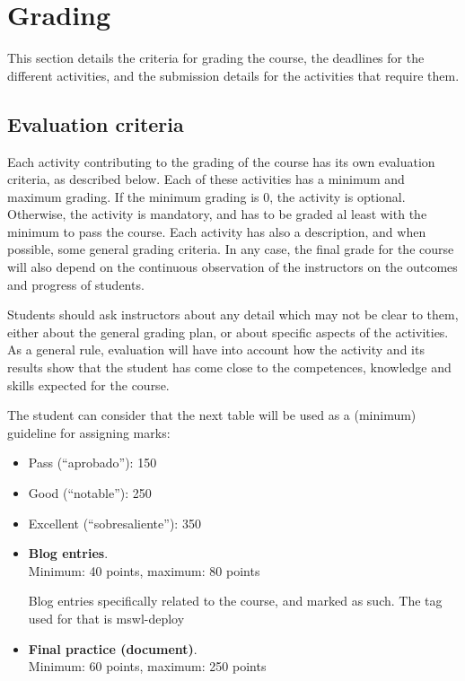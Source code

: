 \documentclass[a4paper]{article}
\begin{document}
\section{Grading}

This section details the criteria for grading the course, the
deadlines for the different activities, and the submission details for
the activities that require them.

\subsection{Evaluation criteria}
\label{sub:evaluation-criteria}

Each activity contributing to the grading of the course has its own
evaluation criteria, as described below. Each of these activities has
a minimum and maximum grading. If the minimum grading is 0, the
activity is optional. Otherwise, the activity is mandatory, and has to
be graded al least with the minimum to pass the course. Each activity
has also a description, and when possible, some general grading
criteria. In any case, the final grade for the course will also depend
on the continuous observation of the instructors on the outcomes and
progress of students.

Students should ask instructors about any detail which may not be
clear to them, either about the general grading plan, or about
specific aspects of the activities. As a general rule, evaluation will
have into account how the activity and its results show that the
student has come close to the competences, knowledge and skills
expected for the course.

The student can consider that the next table will be used as a
(minimum) guideline for assigning marks:

\begin{itemize}
\item Pass (``aprobado''): 150
\item Good (``notable''): 250
\item Excellent (``sobresaliente''): 350
\end{itemize}

\begin{itemize}
\item \textbf{Blog entries}. \\
  Minimum: 40 points, maximum: 80 points

  Blog entries specifically related to the course, and marked as such. The tag used for that is mswl-deploy


\item \textbf{Final practice (document)}. \\
  Minimum: 60 points, maximum: 250 points



\end{itemize}
\end{document}
